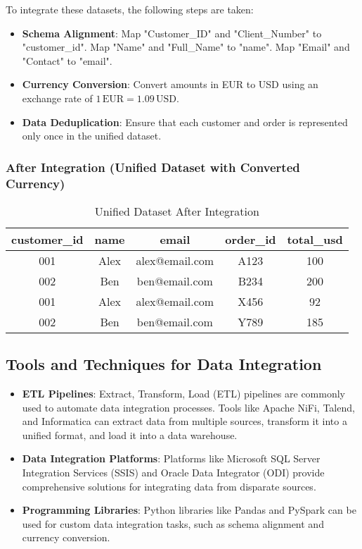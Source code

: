 \documentclass[12pt]{article}
\begin{document}
To integrate these datasets, the following steps are taken:

\begin{itemize}
    \item \textbf{Schema Alignment}: Map "Customer\_ID" and "Client\_Number" to "customer\_id". Map "Name" and "Full\_Name" to "name". Map "Email" and "Contact" to "email".
    \item \textbf{Currency Conversion}: Convert amounts in EUR to USD using an exchange rate of \( 1 \, \text{EUR} = 1.09 \, \text{USD} \).
    \item \textbf{Data Deduplication}: Ensure that each customer and order is represented only once in the unified dataset.
\end{itemize}

\subsubsection{After Integration (Unified Dataset with Converted Currency)}

\begin{table}[h!]
    \centering
    \begin{tabular}{|c|c|c|c|c|}
        \hline
        \textbf{customer\_id} & \textbf{name} & \textbf{email} & \textbf{order\_id} & \textbf{total\_usd} \\
        \hline
        001 & Alex & alex@email.com & A123 & 100 \\
        002 & Ben & ben@email.com & B234 & 200 \\
        001 & Alex & alex@email.com & X456 & 92 \\
        002 & Ben & ben@email.com & Y789 & 185 \\
        \hline
    \end{tabular}
    \caption{Unified Dataset After Integration}
    \label{tab:unified_dataset}
\end{table}

\subsection{Tools and Techniques for Data Integration}

\begin{itemize}
    \item \textbf{ETL Pipelines}: Extract, Transform, Load (ETL) pipelines are commonly used to automate data integration processes. Tools like Apache NiFi, Talend, and Informatica can extract data from multiple sources, transform it into a unified format, and load it into a data warehouse.
    \item \textbf{Data Integration Platforms}: Platforms like Microsoft SQL Server Integration Services (SSIS) and Oracle Data Integrator (ODI) provide comprehensive solutions for integrating data from disparate sources.
    \item \textbf{Programming Libraries}: Python libraries like Pandas and PySpark can be used for custom data integration tasks, such as schema alignment and currency conversion.
\end{itemize}
\end{document}
